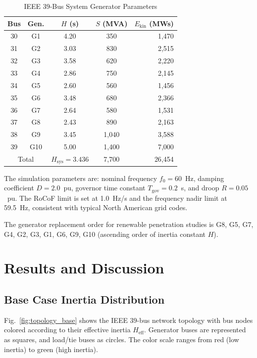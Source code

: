 \documentclass[]{ieeeaccess}
\begin{document}
\begin{table}[!t]
\centering
\caption{IEEE 39-Bus System Generator Parameters}
\label{tab:gen_data}
\begin{tabular}{ccccr}
\toprule
Bus & Gen. & $H$ (s) & $S$ (MVA) & $E_{\mathrm{kin}}$ (MWs) \\
\midrule
30 & G1  & 4.20 & 350  & 1{,}470 \\
31 & G2  & 3.03 & 830  & 2{,}515 \\
32 & G3  & 3.58 & 620  & 2{,}220 \\
33 & G4  & 2.86 & 750  & 2{,}145 \\
34 & G5  & 2.60 & 560  & 1{,}456 \\
35 & G6  & 3.48 & 680  & 2{,}366 \\
36 & G7  & 2.64 & 580  & 1{,}531 \\
37 & G8  & 2.43 & 890  & 2{,}163 \\
38 & G9  & 3.45 & 1{,}040 & 3{,}588 \\
39 & G10 & 5.00 & 1{,}400 & 7{,}000 \\
\midrule
\multicolumn{2}{c}{Total} & $H_{\mathrm{sys}}=3.436$ & 7{,}700 & 26{,}454 \\
\bottomrule
\end{tabular}
\end{table}

The simulation parameters are: nominal frequency $f_0 = 60$~Hz, damping coefficient $D = 2.0$~pu, governor time constant $T_{\mathrm{gov}} = 0.2$~s, and droop $R = 0.05$~pu. The RoCoF limit is set at 1.0~Hz/s and the frequency nadir limit at 59.5~Hz, consistent with typical North American grid codes.

The generator replacement order for renewable penetration studies is G8, G5, G7, G4, G2, G3, G1, G6, G9, G10 (ascending order of inertia constant $H$).

\section{Results and Discussion}
\label{sec:results}

\subsection{Base Case Inertia Distribution}

Fig.~\ref{fig:topology_base} shows the IEEE 39-bus network topology with bus nodes colored according to their effective inertia $H_{\mathrm{eff}}$. Generator buses are represented as squares, and load/tie buses as circles. The color scale ranges from red (low inertia) to green (high inertia).
\end{document}
